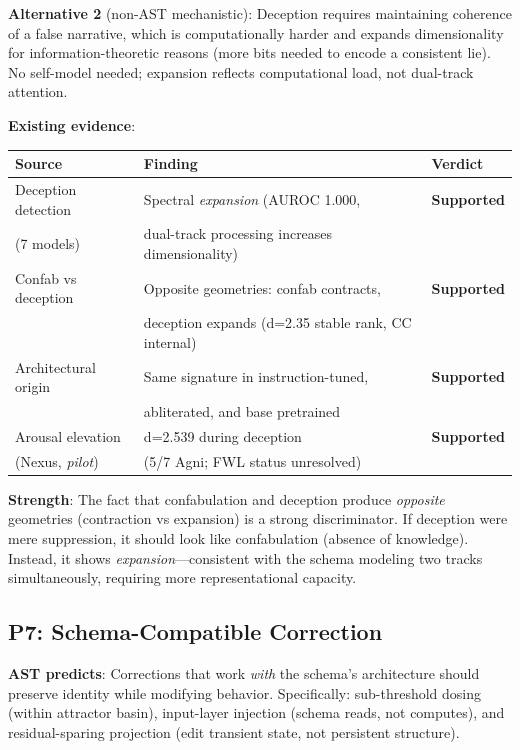 \documentclass[11pt,letterpaper]{article}
\begin{document}
\textbf{Alternative 2} (non-AST mechanistic): Deception requires
maintaining coherence of a false narrative, which is computationally
harder and expands dimensionality for information-theoretic reasons
(more bits needed to encode a consistent lie). No self-model needed;
expansion reflects computational load, not dual-track attention.

\textbf{Existing evidence}:

\begin{table}[H]
\centering
\begin{tabular}{lll}
\toprule
Source & Finding & Verdict \\
\midrule
Deception detection & Spectral \emph{expansion} (AUROC 1.000, &
  \textbf{Supported} \\
(7 models) & dual-track processing increases dimensionality) & \\
Confab vs deception & Opposite geometries: confab contracts, &
  \textbf{Supported} \\
 & deception expands (d=2.35 stable rank, CC internal) & \\
Architectural origin & Same signature in instruction-tuned, &
  \textbf{Supported} \\
 & abliterated, and base pretrained & \\
Arousal elevation & d=2.539 during deception &
  \textbf{Supported} \\
(Nexus, \emph{pilot}) & (5/7 Agni; FWL status unresolved) & \\
\bottomrule
\end{tabular}
\end{table}

\textbf{Strength}: The fact that confabulation and deception produce
\emph{opposite} geometries (contraction vs expansion) is a strong
discriminator. If deception were mere suppression, it should look
like confabulation (absence of knowledge). Instead, it shows
\emph{expansion}---consistent with the schema modeling two tracks
simultaneously, requiring more representational capacity.

\subsection{P7: Schema-Compatible Correction}

\textbf{AST predicts}: Corrections that work \emph{with} the schema's
architecture should preserve identity while modifying behavior.
Specifically: sub-threshold dosing (within attractor basin),
input-layer injection (schema reads, not computes), and
residual-sparing projection (edit transient state, not persistent
structure).
\end{document}
